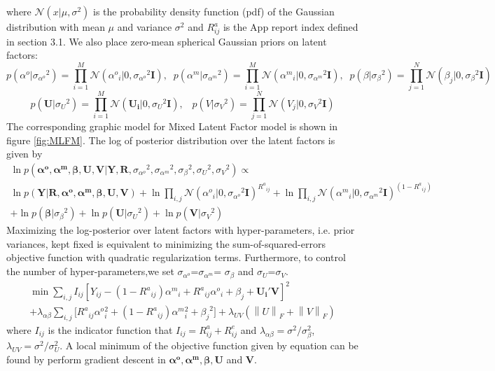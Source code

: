 \documentclass[preprint,12pt]{elsarticle}
\begin{document}
where $\mathcal{N}(x|\mu,\sigma^2)$ is the probability density function (pdf) of the Gaussian distribution with mean $\mu$ and variance $\sigma^2$ and $R^a_{ij}$ is the App report index defined in section 3.1. We also place zero-mean spherical Gaussian priors on latent factors:
\[p({\alpha ^o}|{\sigma _{{\alpha ^o}}}^2) = \prod\limits_{i = 1}^M {\mathcal{N}({\alpha ^o}_i|0,{\sigma _{{\alpha ^o}}}^2{\mathbf{I}})} ,\;\;p({\alpha ^m}|{\sigma _{{\alpha ^m}}}^2) = \prod\limits_{i = 1}^M {\mathcal{N}({\alpha ^m}_i|0,{\sigma _{{\alpha ^m}}}^2{\mathbf{I}})} ,\;\;p(\beta |{\sigma _\beta }^2) = \prod\limits_{j = 1}^N {\mathcal{N}({\beta _j}|0,{\sigma _\beta }^2{\mathbf{I}})} \]
\[p({\mathbf{U}}|{\sigma _U}^2) = \prod\limits_{i = 1}^M {\mathcal{N}({{\mathbf{U}}_{\mathbf{i}}}|0,{\sigma _U}^2{\mathbf{I}})} ,\;\;\;p(V|{\sigma _V}^2) = \prod\limits_{j = 1}^N {\mathcal{N}({V_j}|0,{\sigma _V}^2{\mathbf{I}})} \]
The corresponding graphic model for Mixed Latent Factor model is shown in figure \ref{fig:MLFM}. The log of posterior distribution over the latent factors is given by
\begin{multline*}
\ln p({{\mathbf{\alpha }}^{\mathbf{o}}}{\mathbf{,}}{{\mathbf{\alpha }}^{\mathbf{m}}}{\mathbf{,\beta ,U,V}}|{\mathbf{Y,R}},{\sigma _{{\alpha ^o}}}^2,{\sigma _{{\alpha ^m}}}^2,{\sigma _\beta }^2,{\sigma _U}^2,{\sigma _V}^2) \propto \\
\ln p({\mathbf{Y}}|{\mathbf{R}},{{\mathbf{\alpha }}^{\mathbf{o}}}{\mathbf{,}}{{\mathbf{\alpha }}^{\mathbf{m}}}{\mathbf{,\beta ,U,V}}) + \ln \prod\limits_{i,j} {\mathcal{N}{{({\alpha ^o}_i|0,{\sigma _{{\alpha ^o}}}^2{\mathbf{I}})}^{{R^a}_{ij}}}}  + \ln \prod\limits_{i,j} {\mathcal{N}{{({\alpha ^m}_i|0,{\sigma _{{\alpha ^m}}}^2{\mathbf{I}})}^{(1 - {R^a}_{ij})}}} \\
 + \ln p({\mathbf{\beta }}|{\sigma _\beta }^2) + \ln p({\mathbf{U}}|{\sigma _U}^2) + \ln p({\mathbf{V}}|{\sigma _V}^2)
\end{multline*}
Maximizing the log-posterior over latent factors with hyper-parameters, i.e. prior variances, kept fixed is equivalent to minimizing the sum-of-squared-errors objective function with quadratic regularization terms. Furthermore, to control the number of hyper-parameters,we set $\sigma_{\alpha^o}$=$\sigma_{\alpha^m}$= $\sigma_{\beta}$ and $\sigma_U$=$\sigma_V$.
\begin{multline}
\min \sum\limits_{i,j} {{I_{ij}}{{[{Y_{ij}} - (1 - {R^a}_{ij}){\alpha ^m}_i + {R^a}_{ij}{\alpha ^o}_i + {\beta _j} + {{\mathbf{U}}_{\mathbf{i}}}{\mathbf{'V}}]}^2}}  \\+ {\lambda _{\alpha \beta }}\sum\limits_{i,j} {[{R^a}_{ij}} {\alpha ^o}{_i^2} + (1 - {R^a}_{ij}){\alpha ^m}{_i^2} + {\beta _j}^2] + {\lambda _{UV}}({\left\| U \right\|_F} + {\left\| V \right\|_F})
\end{multline}
where $I_{ij}$ is the indicator function that $I_{ij}=R^a_{ij}+R^e_{ij}$ and $\lambda_{\alpha \beta}=\sigma^2/\sigma_{\beta}^2$, $\lambda_{UV}=\sigma^2/\sigma_{U}^2$. A local minimum of the objective function given by equation can be found by perform gradient descent in ${{\mathbf{\alpha }}^{\mathbf{o}}}{\mathbf{,}}{{\mathbf{\alpha }}^{\mathbf{m}}}{\mathbf{,\beta ,U}}$ and $\mathbf{V}$.
\end{document}

